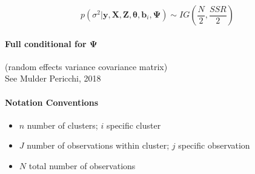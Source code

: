 \documentclass[a4paper]{article}
\begin{document}
\begin{equation}
	p(\sigma^2|\bm{y}, \bm{X}, \bm{Z}, \bm{\theta}, \bm{b}_{i}, \bm{\Psi}) \sim IG(\frac{N}{2}, \frac{SSR}{2})
\end{equation}



\paragraph{Full conditional for $\bm{\Psi}$}(random effects variance covariance matrix)\\

See Mulder Pericchi, 2018

\paragraph{Notation Conventions}

\begin{itemize}
	\item $n$ number of clusters; $i$ specific cluster
	\item $J$ number of observations within cluster; $j$ specific observation
	\item $N$ total number of observations
\end{itemize}
\end{document}
